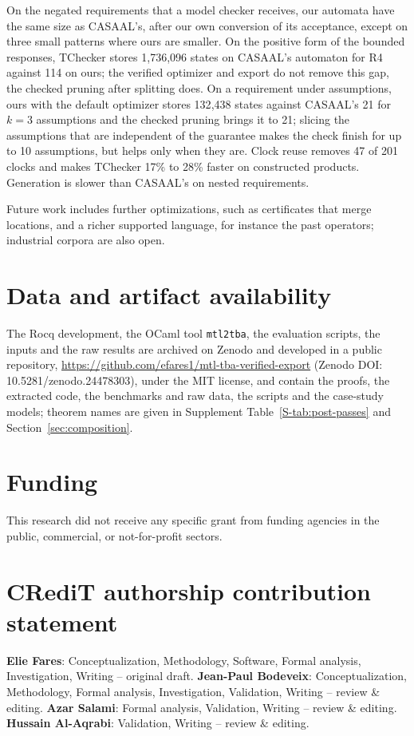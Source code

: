 \documentclass[preprint,12pt]{elsarticle}
\providecommand{\href}[2]{#2}
\begin{document}
On the negated requirements that a model checker receives, our automata have the same size as CASAAL's, after our own conversion of its acceptance, except on three small patterns where ours are smaller. On the positive form of the bounded responses, TChecker stores 1{,}736{,}096 states on CASAAL's automaton for R4 against 114 on ours; the verified optimizer and export do not remove this gap, the checked pruning after splitting does. On a requirement under assumptions, ours with the default optimizer stores 132{,}438 states against CASAAL's 21 for $k=3$ assumptions and the checked pruning brings it to 21; slicing the assumptions that are independent of the guarantee makes the check finish for up to 10 assumptions, but helps only when they are. Clock reuse removes 47 of 201 clocks and makes TChecker 17\% to 28\% faster on constructed products. Generation is slower than CASAAL's on nested requirements.

Future work includes further optimizations, such as certificates that merge locations, and a richer supported language, for instance the past operators; industrial corpora are also open.

\section*{Data and artifact availability}
\label{sec:availability}
The Rocq development, the OCaml tool \texttt{mtl2tba}, the evaluation scripts, the inputs and the raw results are archived on Zenodo and developed in a public repository, \url{https://github.com/efares1/mtl-tba-verified-export} (Zenodo DOI: \href{https://doi.org/10.5281/zenodo.24478303}{10.5281/zenodo.24478303}), under the MIT license, and contain the proofs, the extracted code, the benchmarks and raw data, the scripts and the case-study models; theorem names are given in Supplement Table~\ref{S-tab:post-passes} and Section~\ref{sec:composition}.
\section*{Funding}
This research did not receive any specific grant from funding agencies in the public, commercial, or not-for-profit sectors.

\section*{CRediT authorship contribution statement}
\textbf{Elie Fares}: Conceptualization, Methodology, Software, Formal analysis, Investigation, Writing -- original draft. \textbf{Jean-Paul Bodeveix}: Conceptualization, Methodology, Formal analysis, Investigation, Validation, Writing -- review \& editing. \textbf{Azar Salami}: Formal analysis, Validation, Writing -- review \& editing. \textbf{Hussain Al-Aqrabi}: Validation, Writing -- review \& editing.
\end{document}

